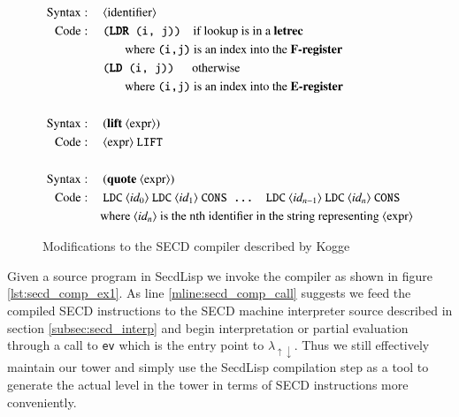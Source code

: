 \documentclass[a4paper,12pt,twoside,openright]{report}
\theoremstyle{definition}
\newcommand{\mslang}{$\lambda_{\uparrow\downarrow}$}
\newcommand{\secdlisp}{SecdLisp}
\begin{document}
\begin{figure}[ht!]
\centering
\begin{alignat}{5}
		\text{Syntax}   & : && \: \text{$\langle$identifier$\rangle$} \\
		\text{Code}     & : && \: \texttt{(\textbf{LDR} (i, j))} \quad \text{if lookup is in a \textbf{letrec}} \nonumber \\
		& && \qquad\text{where \texttt{(i,j)} is an index into the \textbf{F-register}} \nonumber \\
		& && \: \texttt{(\textbf{LD} (i, j))} \quad\:\: \text{otherwise} \nonumber \\
		& && \qquad\text{where \texttt{(i,j)} is an index into the \textbf{E-register}} \nonumber \\
		\nonumber \\%
		\text{Syntax}   & : && \: \text{(\textbf{lift} $\langle$expr$\rangle$)} \\
		\text{Code}     & : && \: \text{$\langle$expr$\rangle$ \texttt{LIFT}} \nonumber \\
		\nonumber \\%
		\text{Syntax}   & : && \: \text{(\textbf{quote} $\langle$expr$\rangle$)} \label{eq:secd_comp_sem_quote} \\
		\text{Code}     & : && \: \text{\texttt{LDC} $\langle id_{0} \rangle$ \texttt{LDC} $\langle id_{1} \rangle$ \texttt{CONS ... LDC} $\langle id_{n-1} \rangle$ \texttt{LDC} $\langle id_{n} \rangle$ \texttt{CONS}} \nonumber \\
		& && \text{where $\langle id_{n} \rangle$ is the nth identifier in the string representing $\langle$expr$\rangle$} \nonumber
\end{alignat}
\caption{Modifications to the SECD compiler described by Kogge \cite{kogge1990architecture}}
\label{fig:secd_comp_semantics}
\end{figure}

Given a source program in \secdlisp{} we invoke the compiler as shown in figure \ref{lst:secd_comp_ex1}. As line \ref{mline:secd_comp_call} suggests we feed the compiled SECD instructions to the SECD machine interpreter source described in section \ref{subsec:secd_interp} and begin interpretation or partial evaluation through a call to \texttt{ev} which is the entry point to \mslang. Thus we still effectively maintain our tower and simply use the \secdlisp{} compilation step as a tool to generate the actual level in the tower in terms of SECD instructions more conveniently.
\end{document}
